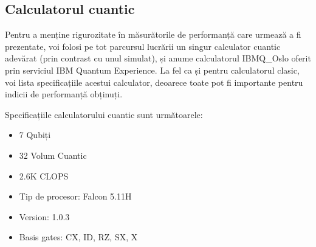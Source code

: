 \pagebreak

\subsection{Calculatorul cuantic}
Pentru a menține rigurozitate în măsurătorile de performanță care urmează a fi prezentate, voi folosi pe tot parcursul lucrării un singur calculator cuantic adevărat (prin contrast cu unul simulat), și anume calculatorul IBMQ\_Oslo oferit prin serviciul IBM Quantum Experience. La fel ca și pentru calculatorul clasic, voi lista specificațiile acestui calculator, deoarece toate pot fi importante pentru indicii de performanță obținuți.

Specificațiile calculatorului cuantic sunt următoarele:
\begin{itemize}
    \item 7 Qubiți
    \item 32 Volum Cuantic
    \item 2.6K CLOPS
    \item Tip de procesor: Falcon 5.11H
    \item Version: 1.0.3
    \item Basis gates: CX, ID, RZ, SX, X
\end{itemize}

